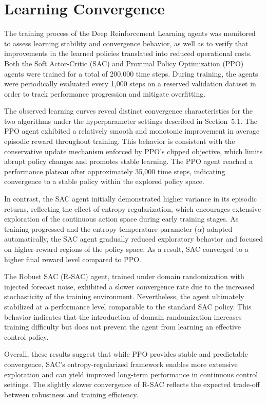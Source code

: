 \section{Learning Convergence}

The training process of the Deep Reinforcement Learning agents was monitored to assess learning stability and convergence behavior, as well as to verify that improvements in the learned policies translated into reduced operational costs. Both the Soft Actor-Critic (SAC) and Proximal Policy Optimization (PPO) agents were trained for a total of 200{,}000 time steps. During training, the agents were periodically evaluated every 1{,}000 steps on a reserved validation dataset in order to track performance progression and mitigate overfitting.

The observed learning curves reveal distinct convergence characteristics for the two algorithms under the hyperparameter settings described in Section~5.1. The PPO agent exhibited a relatively smooth and monotonic improvement in average episodic reward throughout training. This behavior is consistent with the conservative update mechanism enforced by PPO’s clipped objective, which limits abrupt policy changes and promotes stable learning. The PPO agent reached a performance plateau after approximately 35{,}000 time steps, indicating convergence to a stable policy within the explored policy space.

In contrast, the SAC agent initially demonstrated higher variance in its episodic returns, reflecting the effect of entropy regularization, which encourages extensive exploration of the continuous action space during early training stages. As training progressed and the entropy temperature parameter ($\alpha$) adapted automatically, the SAC agent gradually reduced exploratory behavior and focused on higher-reward regions of the policy space. As a result, SAC converged to a higher final reward level compared to PPO.

The Robust SAC (R-SAC) agent, trained under domain randomization with injected forecast noise, exhibited a slower convergence rate due to the increased stochasticity of the training environment. Nevertheless, the agent ultimately stabilized at a performance level comparable to the standard SAC policy. This behavior indicates that the introduction of domain randomization increases training difficulty but does not prevent the agent from learning an effective control policy.

Overall, these results suggest that while PPO provides stable and predictable convergence, SAC’s entropy-regularized framework enables more extensive exploration and can yield improved long-term performance in continuous control settings. The slightly slower convergence of R-SAC reflects the expected trade-off between robustness and training efficiency.
